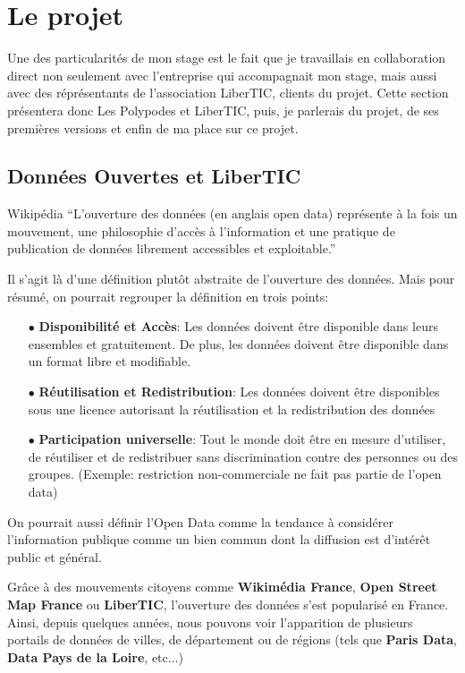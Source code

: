 \section{Le projet}

Une des particularités de mon stage est le fait que je travaillais en collaboration direct non seulement avec l'entreprise qui accompagnait mon stage, mais aussi avec des réprésentants de l'association LiberTIC, clients du projet. Cette section présentera donc Les Polypodes et LiberTIC, puis, je parlerais du projet, de ses premières versions et enfin de ma place sur ce projet.

\subsection{Données Ouvertes et LiberTIC}

\begin{aquote}{Wikipédia}
``L'ouverture des données (en anglais open data) représente à la fois un mouvement, une philosophie d'accès à l'information et une pratique de publication de données librement accessibles et exploitable.''
\end{aquote}

Il s'agit là d'une définition plutôt abstraite de l'ouverture des données. Mais pour résumé, on pourrait regrouper la définition en trois points:

\begin{itemize}
    \item[$\bullet$] \textbf{Disponibilité et Accès}: Les données doivent être disponible dans leurs ensembles et gratuitement. De plus, les données doivent être disponible dans un format libre et modifiable.
    \item[$\bullet$] \textbf{Réutilisation et Redistribution}: Les données doivent être disponibles sous une licence autorisant la réutilisation et la redistribution des données
    \item[$\bullet$] \textbf{Participation universelle}: Tout le monde doit être en mesure d'utiliser, de réutiliser et de redistribuer sans discrimination contre des personnes ou des groupes. (Exemple: restriction non-commerciale ne fait pas partie de l'open data)
\end{itemize}

On pourrait aussi définir l'Open Data comme la tendance à considérer l'information publique comme un bien commun dont la diffusion est d'intérêt public et général.

Grâce à des mouvements citoyens comme \textbf{Wikimédia France}, \textbf{Open Street Map France} ou \textbf{LiberTIC}, l'ouverture des données s'est popularisé en France. Ainsi, depuis quelques années, nous pouvons voir l'apparition de plusieurs portails de données de villes, de département ou de régions (tels que \textbf{Paris Data}, \textbf{Data Pays de la Loire}, etc...)

